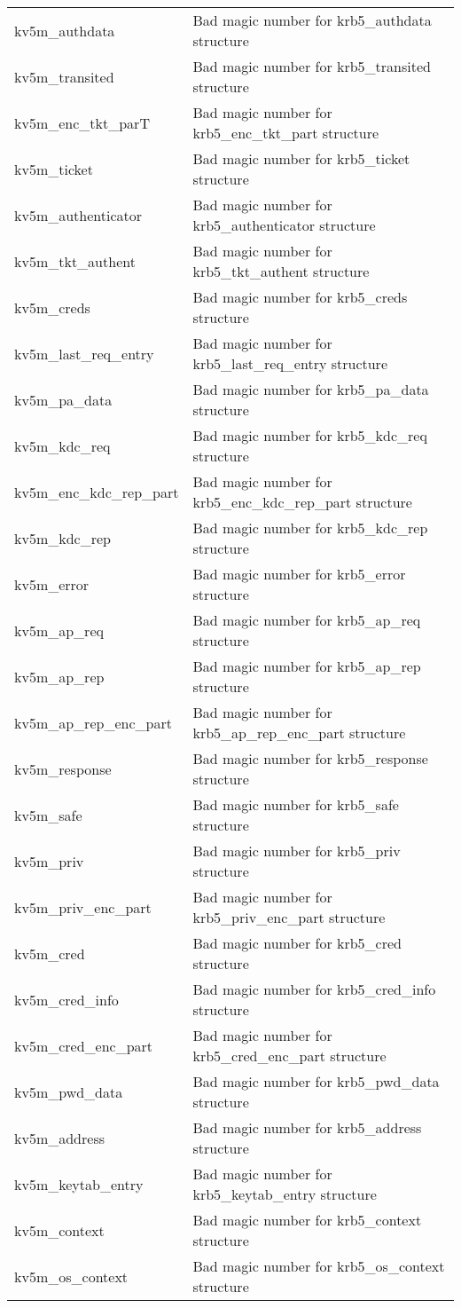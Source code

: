 \begin{small}
\begin{tabular}{ll}
{\sc kv5m_authdata }&	Bad magic number for krb5_authdata structure \\
{\sc kv5m_transited }&	Bad magic number for krb5_transited structure \\
{\sc kv5m_enc_tkt_parT }&	Bad magic number for krb5_enc_tkt_part structure \\
{\sc kv5m_ticket }&		Bad magic number for krb5_ticket structure \\
{\sc kv5m_authenticator }&	Bad magic number for krb5_authenticator structure \\
{\sc kv5m_tkt_authent }&	Bad magic number for krb5_tkt_authent structure \\
{\sc kv5m_creds }&		Bad magic number for krb5_creds structure \\
{\sc kv5m_last_req_entry }&	Bad magic number for krb5_last_req_entry structure \\
{\sc kv5m_pa_data }&		Bad magic number for krb5_pa_data structure \\
{\sc kv5m_kdc_req }&		Bad magic number for krb5_kdc_req structure \\
{\sc kv5m_enc_kdc_rep_part }& Bad magic number for krb5_enc_kdc_rep_part structure \\
{\sc kv5m_kdc_rep }&		Bad magic number for krb5_kdc_rep structure \\
{\sc kv5m_error }&		Bad magic number for krb5_error structure \\
{\sc kv5m_ap_req }&		Bad magic number for krb5_ap_req structure \\
{\sc kv5m_ap_rep }&		Bad magic number for krb5_ap_rep structure \\
{\sc kv5m_ap_rep_enc_part }&	Bad magic number for krb5_ap_rep_enc_part structure \\
{\sc kv5m_response }&	Bad magic number for krb5_response structure \\
{\sc kv5m_safe }&		Bad magic number for krb5_safe structure \\
{\sc kv5m_priv }&		Bad magic number for krb5_priv structure \\
{\sc kv5m_priv_enc_part }&	Bad magic number for krb5_priv_enc_part structure \\
{\sc kv5m_cred }&		Bad magic number for krb5_cred structure \\
{\sc kv5m_cred_info }&	Bad magic number for krb5_cred_info structure \\
{\sc kv5m_cred_enc_part }&	Bad magic number for krb5_cred_enc_part structure \\
{\sc kv5m_pwd_data }&	Bad magic number for krb5_pwd_data structure \\
{\sc kv5m_address }&	Bad magic number for krb5_address structure \\
{\sc kv5m_keytab_entry }&	Bad magic number for krb5_keytab_entry structure \\
{\sc kv5m_context }&	Bad magic number for krb5_context structure \\
{\sc kv5m_os_context }&	Bad magic number for krb5_os_context structure \\

\end{tabular}
\end{small}

